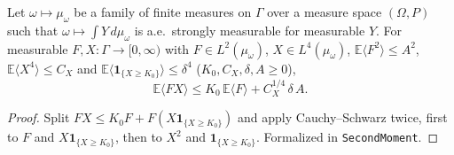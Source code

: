 \begin{lemma}\label{lem:sg-tal:st-tail-split}
  \leanok
{}
Let $\omega\mapsto\mu_\omega$ be a family of finite measures on $\Gamma$ over a measure space $(\Omega,P)$
such that $\omega\mapsto\int Y\,d\mu_\omega$ is a.e.\ strongly measurable for measurable $Y$. For measurable
$F,X:\Gamma\to[0,\infty)$ with $F\in L^2(\mu_\omega)$, $X\in L^4(\mu_\omega)$,
$\mathbb E\langle F^2\rangle\le A^2$, $\mathbb E\langle X^4\rangle\le C_X$ and
$\mathbb E\langle\mathbf 1_{\{X\ge K_0\}}\rangle\le\delta^4$ ($K_0,C_X,\delta,A\ge0$),
\[
\mathbb E\langle F X\rangle\le K_0\,\mathbb E\langle F\rangle+C_X^{1/4}\,\delta\,A.
\]
\end{lemma}
\begin{proof}
  \leanok
Split $F X\le K_0 F+F(X\mathbf 1_{\{X\ge K_0\}})$ and apply Cauchy--Schwarz twice, first to
$F$ and $X\mathbf 1_{\{X\ge K_0\}}$, then to $X^2$ and $\mathbf 1_{\{X\ge K_0\}}$.
Formalized in \texttt{SecondMoment}.
\end{proof}

